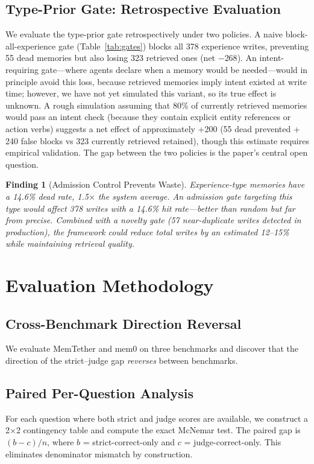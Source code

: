 \documentclass[sigconf,nonacm]{acmart}
\newtheorem{finding}{Finding}
\begin{document}
\subsection{Type-Prior Gate: Retrospective Evaluation}

We evaluate the type-prior gate retrospectively under two policies. A naive block-all-experience gate (Table~\ref{tab:gates}) blocks all 378 experience writes, preventing 55 dead memories but also losing 323 retrieved ones (net $-268$). An intent-requiring gate---where agents declare when a memory would be needed---would in principle avoid this loss, because retrieved memories imply intent existed at write time; however, we have not yet simulated this variant, so its true effect is unknown. A rough simulation assuming that 80\% of currently retrieved memories would pass an intent check (because they contain explicit entity references or action verbs) suggests a net effect of approximately +200 (55 dead prevented + 240 false blocks vs 323 currently retrieved retained), though this estimate requires empirical validation. The gap between the two policies is the paper's central open question.

\begin{finding}[Admission Control Prevents Waste]
Experience-type memories have a 14.6\% dead rate, 1.5$\times$ the system average. An admission gate targeting this type would affect 378 writes with a 14.6\% hit rate---better than random but far from precise. Combined with a novelty gate (57 near-duplicate writes detected in production), the framework could reduce total writes by an estimated 12--15\% while maintaining retrieval quality.
\end{finding}

\section{Evaluation Methodology}
\label{sec:evaluation}

\subsection{Cross-Benchmark Direction Reversal}
We evaluate MemTether and mem0 on three benchmarks and discover that the direction of the strict--judge gap \emph{reverses} between benchmarks.

\subsection{Paired Per-Question Analysis}
For each question where both strict and judge scores are available, we construct a 2$\times$2 contingency table and compute the exact McNemar test. The paired gap is $(b - c)/n$, where $b$ = strict-correct-only and $c$ = judge-correct-only. This eliminates denominator mismatch by construction.
\end{document}
